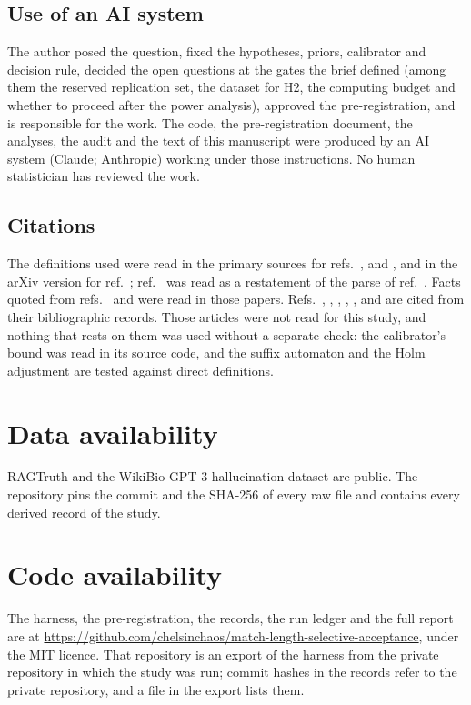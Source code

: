 \documentclass[11pt]{article}
\begin{document}
\subsection*{Use of an AI system}
The author posed the question, fixed the hypotheses, priors, calibrator and decision rule, decided the open questions at the gates the brief defined (among them the reserved replication set, the dataset for H2, the computing budget and whether to proceed after the power analysis), approved the pre-registration, and is responsible for the work. The code, the pre-registration document, the analyses, the audit and the text of this manuscript were produced by an AI system (Claude; Anthropic) working under those instructions. No human statistician has reviewed the work.

\subsection*{Citations}
The definitions used were read in the primary sources for refs.~,  and , and in the arXiv version for ref.~; ref.~ was read as a restatement of the parse of ref.~. Facts quoted from refs.~ and  were read in those papers. Refs.~, , , , ,  and  are cited from their bibliographic records. Those articles were not read for this study, and nothing that rests on them was used without a separate check: the calibrator's bound was read in its source code, and the suffix automaton and the Holm adjustment are tested against direct definitions.

\section*{Data availability}
RAGTruth and the WikiBio GPT-3 hallucination dataset are public. The repository pins the commit and the SHA-256 of every raw file and contains every derived record of the study.

\section*{Code availability}
The harness, the pre-registration, the records, the run ledger and the full report are at \url{https://github.com/chelsinchaos/match-length-selective-acceptance}, under the MIT licence. That repository is an export of the harness from the private repository in which the study was run; commit hashes in the records refer to the private repository, and a file in the export lists them.
\end{document}
